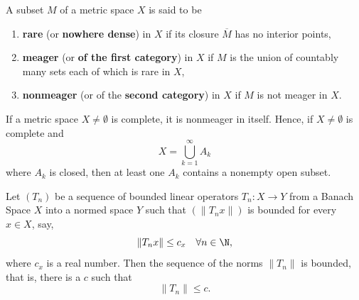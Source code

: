 \begin{definition}[Category]
    A subset \( M  \) of a metric space \( X  \) is said to be 
    \begin{enumerate}
        \item[(a)] \textbf{rare} (or \textbf{nowhere dense}) in \( X  \) if its closure \( \overline{M} \) has no interior points,
        \item[(b)] \textbf{meager} (or \textbf{of the first category}) in \( X  \) if \( M  \) is the union of countably many sets each of which is rare in \( X  \), 
        \item[(c)] \textbf{nonmeager} (or of the \textbf{second category}) in \( X  \) if \( M  \) is not meager in \( X  \).
    \end{enumerate}
\end{definition}

\begin{theorem}
   If a metric space \( X \neq \emptyset \) is complete, it is nonmeager in itself. Hence, if \( X \neq \emptyset \) is complete and  
   \[  X = \bigcup_{ k=1  }^{ \infty  }  {A}_{k} \]
   where \( {A}_{k} \) is closed, then at least one \( {A}_{k} \) contains a nonempty open subset.
\end{theorem}

\begin{theorem}
    Let \( ({T}_{n}) \) be a sequence of bounded linear operators \( {T}_{n} : X \to Y  \) from a Banach Space \( X  \) into a normed space \( Y  \) such that \( (\|{T}_{n}x\|) \) is bounded for every \( x \in X \), say, 
    \[  \|{T}_{n}x\| \leq {c}_{x} \ \ \ \forall n \in \N, \]
    where \( {c}_{x} \) is a real number. Then the sequence of the norms \( \|{T}_{n}\| \) is bounded, that is, there is a \( c  \) such that 
    \[  \|{T}_{n}\| \leq c.  \]
\end{theorem}
